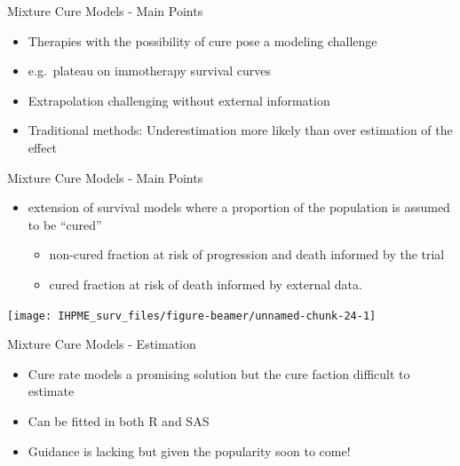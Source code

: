 \documentclass[
  ignorenonframetext,
]{beamer}
\providecommand{\tightlist}{%
  \setlength{\itemsep}{0pt}\setlength{\parskip}{0pt}}
\begin{document}
\begin{frame}{Mixture Cure Models - Main Points}
\protect\hypertarget{mixture-cure-models---main-points}{}

\begin{itemize}
\tightlist
\item
  Therapies with the possibility of cure pose a modeling challenge
\item
  e.g.~plateau on immotherapy survival curves
\item
  Extrapolation challenging without external information
\item
  Traditional methods: Underestimation more likely than over estimation
  of the effect
\end{itemize}

\end{frame}

\begin{frame}{Mixture Cure Models - Main Points}
\protect\hypertarget{mixture-cure-models---main-points-1}{}

\begin{itemize}
\tightlist
\item
  extension of survival models where a proportion of the population is
  assumed to be ``cured''

  \begin{itemize}
  \tightlist
  \item
    non-cured fraction at risk of progression and death informed by the
    trial
  \item
    cured fraction at risk of death informed by external data.
  \end{itemize}
\end{itemize}

\texttt{[image: IHPME\_surv\_files/figure-beamer/unnamed-chunk-24-1]}

\end{frame}

\begin{frame}{Mixture Cure Models - Estimation}
\protect\hypertarget{mixture-cure-models---estimation}{}

\begin{itemize}
\item
  Cure rate models a promising solution but the cure faction difficult
  to estimate
\item
  Can be fitted in both R and SAS
\item
  Guidance is lacking but given the popularity soon to come!
\end{itemize}

\end{frame}
\end{document}
